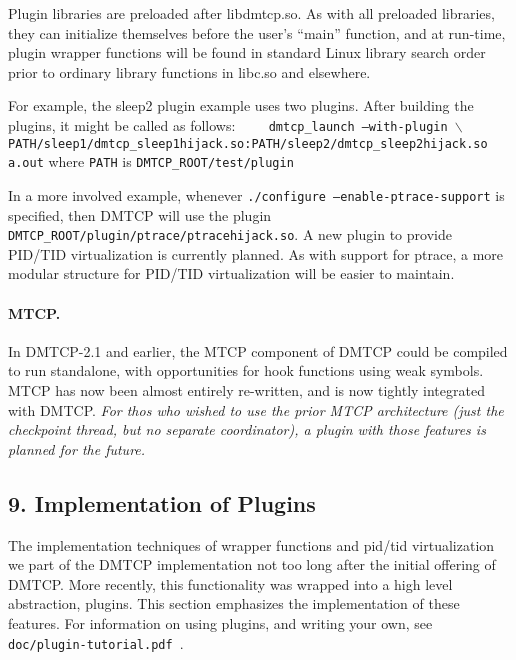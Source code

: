 \documentclass{article}
\begin{document}
Plugin libraries are preloaded after libdmtcp.so.  As with all
preloaded libraries, they can initialize themselves before the user's
``main'' function, and at run-time, plugin wrapper functions will
be found in standard Linux library search order prior to ordinary
library functions in libc.so and elsewhere.

For example, the sleep2 plugin example uses two plugins.  After building
the plugins, it might be called as follows: \newline
{\tt
\hbox{\ \ }  dmtcp\_launch --with-plugin $\backslash$ \newline
\hbox{\ \ \ \ }
 PATH/sleep1/dmtcp\_sleep1hijack.so:PATH/sleep2/dmtcp\_sleep2hijack.so a.out}
 \newline
where {\tt PATH} is {\tt DMTCP\_ROOT/test/plugin}

In a more involved example, whenever {\tt ./configure
--enable-ptrace-support} is specified, then DMTCP will use the plugin
{\tt DMTCP\_ROOT/plugin/ptrace/ptracehijack.so}.  A new plugin to
provide PID/TID virtualization is currently planned.  As with support
for ptrace, a more modular structure for PID/TID virtualization will be
easier to maintain.

\paragraph{MTCP.}

In DMTCP-2.1 and earlier, the MTCP component of DMTCP could be compiled
to run standalone, with opportunities for hook functions using weak symbols.
MTCP has now been almost entirely re-written, and is now tightly integrated
with DMTCP.  {\em For thos who wished to use the prior MTCP architecture
(just the checkpoint thread, but no separate coordinator), a plugin
with those features is planned for the future.}

\subsection*{9. Implementation of Plugins}

The implementation techniques of wrapper functions and pid/tid virtualization
we part of the DMTCP implementation not too long after the
initial offering of DMTCP.  More recently, this functionality was
wrapped into a high level abstraction, plugins.  This section emphasizes
the implementation of these features.  For information on using plugins,
and writing your own, see {\tt doc/plugin-tutorial.pdf}~.
\end{document}
